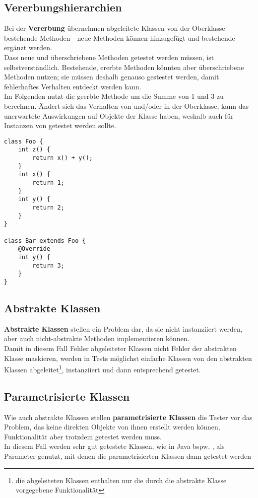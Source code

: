 \subsection*{Vererbungshierarchien}
Bei der \textbf{Vererbung} übernehmen abgeleitete Klassen von der Oberklasse bestehende Methoden - neue Methoden können hinzugefügt und bestehende ergänzt werden.\\
Dass neue und überschriebene Methoden getestet werden müssen, ist selbstverständlich.
Bestehende, ererbte Methoden könnten aber überschriebene Methoden nutzen; sie müssen deshalb genauso gestestet werden, damit fehlerhaftes Verhalten entdeckt werden kann.\\
Im Folgenden nutzt  die geerbte Methode  um die Summe von $1$ und $3$ zu berechnen.
Ändert sich das Verhalten von  und/oder in der Oberklasse, kann das unerwartete Auswirkungen auf Objekte der Klasse  haben, weshalb auch  für  Instanzen von  getestet werden sollte.

\begin{verbatim}
class Foo {
    int z() {
        return x() + y();
    }
    int x() {
        return 1;
    }
    int y() {
        return 2;
    }
}

class Bar extends Foo {
    @Override
    int y() {
        return 3;
    }
}
\end{verbatim}


\subsection*{Abstrakte Klassen}
\textbf{Abstrakte Klassen} stellen ein Problem dar, da sie nicht instanziiert werden, aber auch nicht-abstrakte Methoden implementieren können.\\
Damit in diesem Fall Fehler abgeleiteter Klassen nicht Fehler der abstrakten Klasse maskieren, werden in Tests möglichst einfache Klassen von den abstrakten Klassen abgeleitet\footnote{
    die abgeleiteten Klassen enthalten nur die durch die abstrakte Klasse vorgegebene Funktionalität
}, instanziiert und dann entsprechend getestet.

\subsection*{Parametrisierte Klassen}
Wie auch abstrakte Klassen stellen \textbf{parametrisierte Klassen} die Tester vor das Problem, das keine direkten Objekte von ihnen erstellt werden können, Funktionalität aber trotzdem getestet werden muss.\\
In diesem Fall werden sehr gut getestete Klassen, wie in Java bspw. , als Parameter genutzt, mit denen die parametrisierten Klassen dann getestet werden